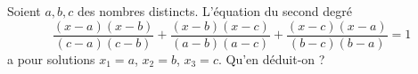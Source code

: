 Soient $a, b, c$ des nombres distincts. L'équation du second degré
\[ \frac{(x - a)(x - b)}{(c - a)(c - b)} + \frac{(x - b)(x - c)}{(a - b)(a - c)} + \frac{(x - c)(x - a)}{(b - c)(b - a)} = 1 \]
a pour solutions $x_1 = a$, $x_2 = b$, $x_3 = c$. Qu'en déduit-on ?
